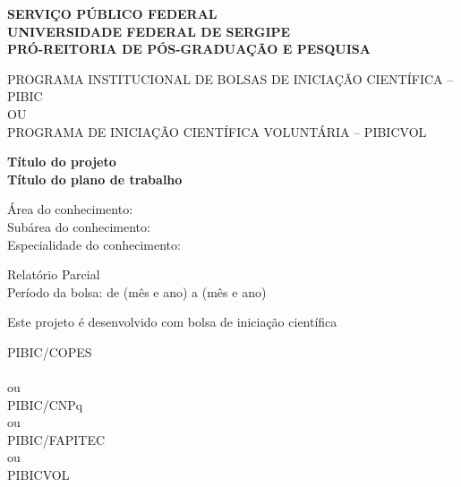 \documentclass[12pt, a4paper]{article}
\makeatletter
\renewcommand\tableofcontents{
  \null\hfill\textbf{\Large\contentsname}\hfill\null\par
  \@mkboth{\MakeUppercase\contentsname}{\MakeUppercase\contentsname}
  \@starttoc{toc}
}
\makeatother
\begin{document}
 \begin{center}
 
 \normalsize \textbf{SERVIÇO PÚBLICO FEDERAL\\ 
UNIVERSIDADE FEDERAL DE SERGIPE\\ 
PRÓ-REITORIA DE PÓS-GRADUAÇÃO E PESQUISA}
\vspace{10mm} 

\normalsize
PROGRAMA INSTITUCIONAL DE BOLSAS DE INICIAÇÃO CIENTÍFICA – PIBIC\\ OU\\
PROGRAMA DE INICIAÇÃO CIENTÍFICA VOLUNTÁRIA – PIBICVOL


\vspace{20mm}

\textbf{\Large  Título do projeto\\ \normalsize Título do plano de trabalho}

\vspace{19mm}
 {\normalsize Área do conhecimento: \\
Subárea do conhecimento: \\
Especialidade do conhecimento: \\}
\vspace{19mm}

{\normalsize Relatório Parcial\\
Período da bolsa: de (mês e ano) a (mês e ano)}
\vspace{10mm}

 {\large Este projeto é desenvolvido com bolsa de iniciação científica}
\vspace{10mm}

\large{
PIBIC/COPES\\
\\ou\\
PIBIC/CNPq
\\ou\\
PIBIC/FAPITEC
\\ou\\
PIBICVOL\\}


 \end{center}
 
 
 


 
\newpage


 
 \begin{flushleft}
 
\tableofcontents 

 





\end{flushleft}
\newpage
\end{document}
